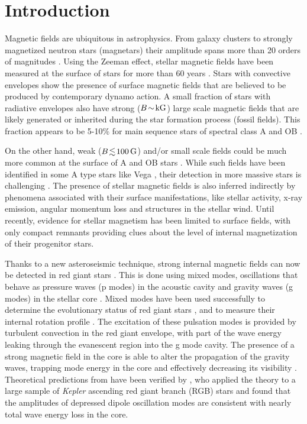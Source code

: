\section{Introduction}%
Magnetic fields are ubiquitous in astrophysics. From  galaxy clusters to strongly magnetized neutron stars (magnetars) their amplitude spans more than 20 orders of magnitudes \citep{Brandenburg_2005}. Using the Zeeman effect, stellar magnetic fields have been measured at the surface of stars
for more than 60 years \citep{Babcock_1947,Landstreet_1992,Donati_2009}. Stars with convective envelopes show the presence of surface magnetic fields that are believed to be produced by contemporary dynamo action. A small fraction of stars with radiative envelopes also have strong ($B \! \sim \! {\rm kG}$) large scale magnetic fields that are likely generated or inherited during the star formation process (fossil fields). This fraction appears to be 5-10\% for main sequence stars of spectral class A \citep[e.g.,][]{Auriere2004} and OB \citep{2012ASPC..464..405W}.

On the other hand, weak ($B \! \lesssim \! 100 \, {\rm G}$) and/or small scale fields could be much more common at the surface of A and OB stars \citep{Cantiello_2011,Braithwaite_2012}. While such fields have been identified in some A type stars like Vega \citep{Lignieres2009}, their detection in more massive stars is challenging \citep{2013A&A...554A..93K}. The presence of stellar magnetic fields is also inferred indirectly by phenomena associated with their surface manifestations, like stellar activity, x-ray emission, angular momentum loss and structures in the stellar wind. Until recently, evidence for stellar magnetism has been limited to surface fields, with only compact remnants providing clues about the level of internal magnetization of their progenitor stars.

Thanks to a new asteroseismic technique, strong internal magnetic fields can now be detected in red giant stars \citep{Fuller_2015}. This is done using mixed modes, oscillations that behave as pressure waves (p modes) in the acoustic cavity and gravity waves (g modes) in the stellar core \cite{Dupret_2009}. Mixed modes have been used successfully to determine the evolutionary status of red giant stars \citep{Bedding_2011}, and to measure their internal rotation profile \citep{Beck_2011}.  The excitation of these pulsation modes is provided by turbulent convection in the red giant envelope, with part of the wave energy leaking through the evanescent region into the g mode cavity. The presence of a strong magnetic field in the core is able to alter the propagation of the gravity waves, trapping  mode energy in the core and effectively decreasing its visibility \citep[magnetic greenhouse effect,]{Fuller_2015}. Theoretical predictions from \citet{Fuller_2015} have been verified by \citet{Stello_2016}, who applied the theory to a large sample of {\it Kepler} ascending red giant branch (RGB) stars and found that the amplitudes of depressed dipole oscillation modes are consistent with nearly total wave energy loss in the core.


